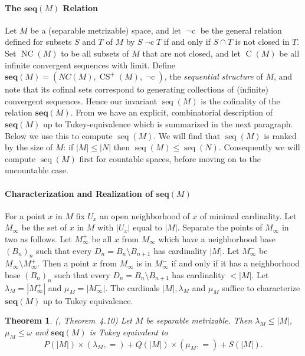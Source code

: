 \documentclass{article}
\newtheorem{thm}{Theorem}[section]
\DeclareMathOperator{\nci}{\neg c}
\begin{document}
\paragraph{The $\mathbf{seq}(M)$ Relation} 
Let $M$ be a (separable metrizable) space, and let $\nci$ be the general relation defined for subsets $S$ and $T$ of $M$ by  
$S \nci T$ if and only if $S \cap T$ is not closed in $T$. 
Set $\mathop{NC}(M)$ to be all subsets of $M$ that are not closed, and let   
 $\mathop{CS^+}(M)$ be all infinite convergent sequences with limit. 
Define $\mathbf{seq}(M)=(NC(M),\mathop{CS}^+(M),\nci)$,
the \emph{sequential structure} of $M$, and  note that its cofinal sets correspond to generating collections of (infinite) convergent sequences. 
Hence our invariant $\mathop{seq}(M)$ is the cofinality of the relation $\mathbf{seq}(M)$. From \cite{FG_Shape} we have an explicit, combinatorial description of $\mathbf{seq}(M)$ up to Tukey-equivalence which is summarized in the next paragraph. Below we use this to compute $\mathop{seq}(M)$. 
We will find that $\mathop{seq}(M)$ is ranked by the size of $M$: if $|M| \le |N|$ then $\mathop{seq}(M)\le\mathop{seq}(N)$. Consequently we will compute $\mathop{seq}(M)$ first for countable spaces, before moving on to the uncountable case.



\paragraph{Characterization and Realization of $\mathbf{seq}(M)$}
For a point $x$ in $M$ fix $U_x$ an open neighborhood of $x$ of minimal cardinality. 
 Let $M_\infty$  be the set of $x$ in $M$ with $|U_x|$ equal to $|M|$. 
Separate the points of $M_\infty$ in two as follows. Let $M_\infty^+$ be all $x$ from $M_\infty$ which have a neighborhood base $(B_n)_n$ such that every $D_n=B_n \setminus B_{n+1}$ has cardinality $|M|$. Let $M_\infty^-$ be $M_\infty \setminus M_\infty^+$.
Then a point $x$ from $M_\infty$ is in $M_\infty^-$ if and only if it has a neighborhood base $(B_n)_n$ such that every $D_n=B_n \setminus B_{n+1}$ has cardinality $<|M|$. 
Let $\lambda_M=|M_\infty^+|$ and $\mu_M=|M_\infty^-|$. 
The cardinals $|M|,\lambda_M$ and $\mu_M$ suffice to characterize $\mathbf{seq}(M)$ up to Tukey equivalence.


\begin{thm}\label{thm:seqTukeyEquivalence} (\cite{FG_Shape}, Theorem~4.10) Let $M$ be separable metrizable.  Then $\lambda_M \le |M|$, $\mu_M \le \omega$ and $\mathbf{seq}(M)$ is Tukey equivalent to 
    \[
    P(|M|) \times (\lambda_M,=) + Q(|M|) \times (\mu_M,=) + S(|M|).
    \]   
\end{thm}
\end{document}
